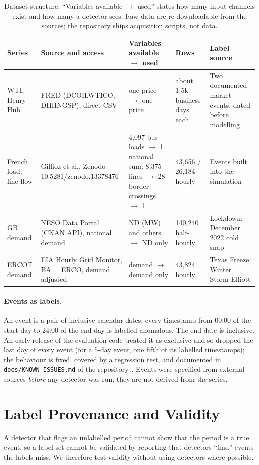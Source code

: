 \documentclass[10pt,twocolumn]{article}
\begin{document}
\begin{table}[t]
\centering\scriptsize\setlength{\tabcolsep}{3pt}
\begin{tabular}{p{}p{}p{}p{}p{}}
\toprule
Series & Source and access & Variables available $\to$ used & Rows & Label source \\
\midrule
WTI, Henry Hub & FRED (DCOILWTICO, DHHNGSP), direct CSV & one price $\to$ one price & about 1.5k business days each & Two documented market events, dated before modelling \\
French load, line flow & Gillioz et al., Zenodo 10.5281/zenodo.13378476 & 4{,}097 bus loads $\to$ 1 national sum; 8{,}375 lines $\to$ 28 border crossings $\to$ 1 & 43{,}656 / 26{,}184 hourly & Events built into the simulation \\
GB demand & NESO Data Portal (CKAN API), national demand & ND (MW) and others $\to$ ND only & 140{,}240 half-hourly & Lockdown; December 2022 cold snap \\
ERCOT demand & EIA Hourly Grid Monitor, BA = ERCO, demand adjusted & demand $\to$ demand only & 43{,}824 hourly & Texas Freeze; Winter Storm Elliott \\
\bottomrule
\end{tabular}
\caption{Dataset structure. ``Variables available $\to$ used'' states how many input channels exist and how many a detector sees. Raw data are re-downloadable from the sources; the repository ships acquisition scripts, not data.}\label{tab:cards}
\end{table}

\paragraph{Events as labels.} An event is a pair of inclusive calendar dates; every timestamp from 00:00 of the start day to 24:00 of the end day is labelled anomalous. The end date is inclusive. An early release of the evaluation code treated it as exclusive and so dropped the last day of every event (for a 5-day event, one fifth of its labelled timestamps); the behaviour is fixed, covered by a regression test, and documented in \texttt{docs/KNOWN\_ISSUES.md} of the repository~\cite{repo}. Events were specified from external sources \emph{before} any detector was run; they are not derived from the series.

\section{Label Provenance and Validity}\label{sec:labels}
A detector that flags an unlabelled period cannot show that the period is a true event, so a label set cannot be validated by reporting that detectors ``find'' events the labels miss. We therefore test validity without using detectors where possible.
\end{document}
